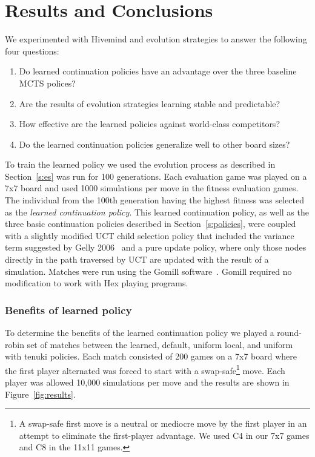 \documentclass{acm_proc_article-sp}
\begin{document}
\section{Results and Conclusions}\label{results}

We experimented with Hivemind and evolution strategies to answer the following four questions:
\begin{enumerate}
\item Do learned continuation policies have an advantage over the three baseline MCTS polices?
\item Are the results of evolution strategies learning stable and predictable?
\item How effective are the learned policies against world-class competitors?
\item Do the learned continuation policies generalize well to other board sizes?
\end{enumerate}

To train the learned policy we used the evolution process as described in Section~\ref{s:es} was run for 100 generations.  
Each evaluation game was played on a 7x7 board and used 1000 simulations per move in the fitness evaluation games. 
The individual from the 100th generation having the highest fitness was selected as the \emph{learned continuation policy}.
This learned continuation policy, as well as the three basic continuation policies described in Section~\ref{s:policies}, were coupled with
a slightly modified UCT child selection policy that included the variance term suggested by Gelly 2006~\cite{gelly2006exploration} and a
pure update policy, where only those nodes directly in the path traversed by UCT are updated with the result of a simulation.
Matches were run using the Gomill software~\cite{gomill}. 
Gomill required no modification to work with Hex playing programs.  

\subsubsection*{Benefits of learned policy}
To determine the benefits of the learned continuation policy we played a round-robin set of matches between the learned, 
default, uniform local, and uniform with tenuki policies.
Each match consisted of 200 games on a 7x7 board where the first player alternated was forced to start with a
swap-safe\footnote{A swap-safe first move is a neutral or mediocre move by the first player in an attempt to eliminate the first-player advantage.  We used C4 in our 7x7 games and C8 in the 11x11 games.}
move.
Each player was allowed 10,000 simulations per move and the results are shown in Figure~\ref{fig:results}.
\end{document}
